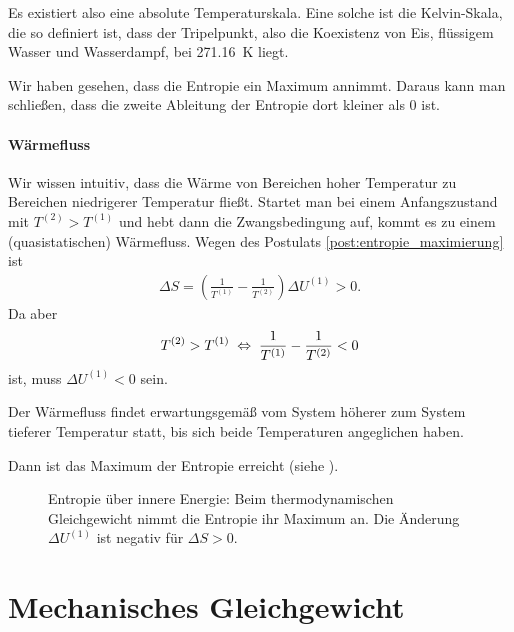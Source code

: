 \begin{formal}
    Es existiert also eine absolute Temperaturskala. Eine solche ist die Kelvin-Skala, die so definiert ist, dass der Tripelpunkt, also die Koexistenz von Eis, flüssigem Wasser und Wasserdampf, bei \SI{271,16}{\kelvin} liegt.
\end{formal}

Wir haben gesehen, dass die Entropie ein Maximum annimmt. Daraus kann man schließen, dass die zweite Ableitung der Entropie dort kleiner als $0$ ist.

\paragraph*{Wärmefluss}

Wir wissen intuitiv, dass die Wärme von Bereichen hoher Temperatur zu Bereichen niedrigerer Temperatur fließt. Startet man bei einem Anfangszustand mit $T^{(2)}> T^{(1)}$ und hebt dann die Zwangsbedingung auf, kommt es zu einem (quasistatischen) Wärmefluss.
Wegen des Postulats \ref{post:entropie_maximierung} ist
\begin{align*}
    \Delta S= \left(\frac{1}{T^{(1)}}-\frac{1}{T^{(2)}}\right)\Delta U^{(1)} > 0.
\end{align*}
Da aber
\begin{align*}
    T^{(2)}> T^{(1)} \;\Leftrightarrow\; \frac{1}{T^{(1)}}-\frac{1}{T^{(2)}} < 0
\end{align*}
ist, muss $\Delta U^{(1)} <0$ sein.
\begin{formal}
    Der Wärmefluss findet erwartungsgemäß vom System höherer zum System tieferer Temperatur statt, bis sich beide Temperaturen angeglichen haben.
\end{formal}
Dann ist das Maximum der Entropie erreicht (siehe ).

\begin{figure}[htbp]
    \centering
    \tfigFunktionEntropieMaximum
    \caption{Entropie über innere Energie: Beim thermodynamischen Gleichgewicht nimmt die Entropie ihr Maximum an. Die Änderung $\Delta U^{(1)}$ ist negativ für $\Delta S>0$. }
    \label{fig:FunktionEntropieMaximum}
\end{figure}




\section{Mechanisches Gleichgewicht}


